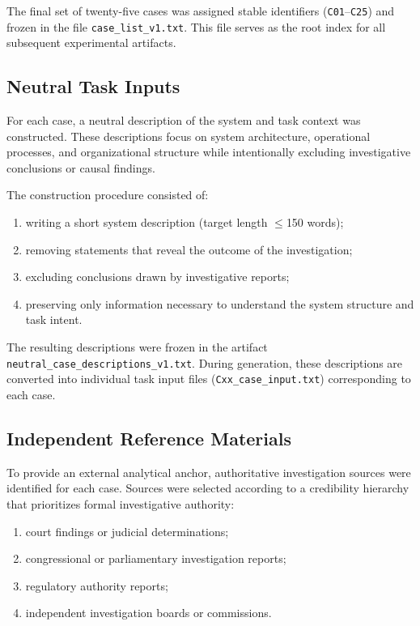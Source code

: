 The final set of twenty-five cases was assigned stable identifiers
(\texttt{C01}--\texttt{C25}) and frozen in the file
\texttt{case\_list\_v1.txt}. This file serves as the root index for all
subsequent experimental artifacts.

\subsection{Neutral Task Inputs}

For each case, a neutral description of the system and task context was
constructed. These descriptions focus on system architecture, operational
processes, and organizational structure while intentionally excluding
investigative conclusions or causal findings.

The construction procedure consisted of:

\begin{enumerate}

\item writing a short system description (target length $\leq$150 words);

\item removing statements that reveal the outcome of the investigation;

\item excluding conclusions drawn by investigative reports;

\item preserving only information necessary to understand the system
structure and task intent.

\end{enumerate}

The resulting descriptions were frozen in the artifact
\texttt{neutral\_case\_descriptions\_v1.txt}. During generation, these
descriptions are converted into individual task input files
(\texttt{Cxx\_case\_input.txt}) corresponding to each case.

\subsection{Independent Reference Materials}

To provide an external analytical anchor, authoritative investigation
sources were identified for each case. Sources were selected according to a
credibility hierarchy that prioritizes formal investigative authority:

\begin{enumerate}

\item court findings or judicial determinations;

\item congressional or parliamentary investigation reports;

\item regulatory authority reports;

\item independent investigation boards or commissions.

\end{enumerate}

